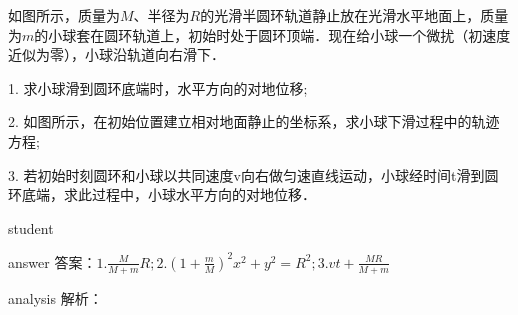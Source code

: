 \begin{example}
	如图所示，质量为$ M $、半径为$ R $的光滑半圆环轨道静止放在光滑水平地面上，质量为$ m $的小球套在圆环轨道上，初始时处于圆环顶端．现在给小球一个微扰（初速度近似为零），小球沿轨道向右滑下．
	
	1. 求小球滑到圆环底端时，水平方向的对地位移; 
	
	2. 如图所示，在初始位置建立相对地面静止的坐标系，求小球下滑过程中的轨迹方程; 
	
	3. 若初始时刻圆环和小球以共同速度v向右做匀速直线运动，小球经时间t滑到圆环底端，求此过程中，小球水平方向的对地位移．
	
	\begin{taggedblock}{student}
		\vspace*{2cm}
	\end{taggedblock}
	
	
	\begin{taggedblock}{answer}
		答案：$ 1. \frac{M}{M+m}R;2. (1+\frac{m}{M})^2x^2+y^2 = R^2; 3. vt+\frac{MR}{M+m} $
	\end{taggedblock}
	
	
	\begin{taggedblock}{analysis}
		解析：
	\end{taggedblock}
\end{example}

